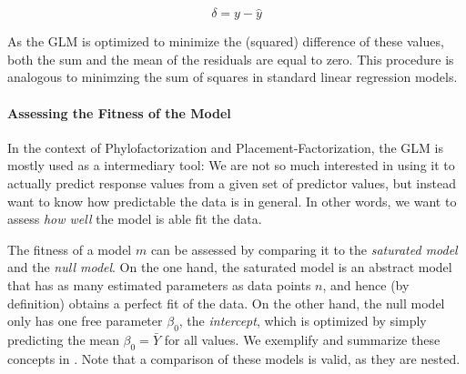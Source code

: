 \begin{equation}
    \label{sec:Factorization:sub:GLM:eq:residuals}
    \delta = y - \hat{y}
\end{equation}

As the \ac{GLM} is optimized to minimize the (squared) difference of these values,
both the sum and the mean of the residuals are equal to zero.
This procedure is analogous to minimzing the sum of squares in standard linear regression models.



\paragraph{Assessing the Fitness of the Model}
\label{sec:Factorization:sub:Methods:sub:GLMs:par:Fitness}

In the context of Phylofactorization and Placement-Factorization,
the \ac{GLM} is mostly used as a intermediary tool:
We are not so much interested in using it to actually predict response values from a given set of predictor values,
but instead want to know how predictable the data is in general.
In other words, we want to assess \emph{how well} the model is able fit the data.


The fitness of a model $m$ can be assessed by comparing it to the \emph{saturated model} and the \emph{null model}.
On the one hand, the saturated model is an abstract model that has as many estimated parameters as data points $n$,
and hence (by definition) obtains a perfect fit of the data.
On the other hand, the null model only has one free parameter $\beta_0$, the \emph{intercept},
which is optimized by simply predicting the mean $\beta_0 = \bar{Y}$ for all values.
We exemplify and summarize these concepts in .
Note that a comparison of these models is valid, as they are nested.

